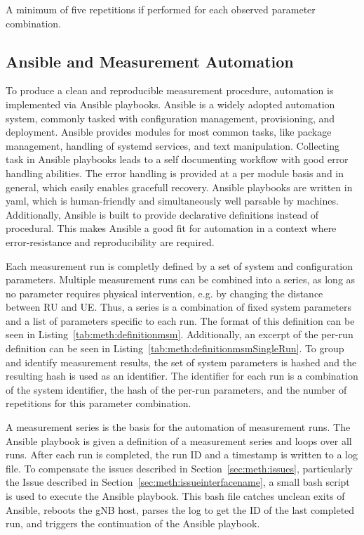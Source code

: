 A minimum of five repetitions if performed for each observed parameter combination.


\subsection{Ansible and Measurement Automation}\label{sec:meth:measureautomation}
To produce a clean and reproducible measurement procedure, automation is implemented via Ansible playbooks.\cite{ansible}
Ansible is a widely adopted automation system, commonly tasked with configuration management,
provisioning, and deployment.
Ansible provides modules for most common tasks, like package management, handling of systemd services, and text manipulation.
Collecting task in Ansible playbooks leads to a self documenting workflow with good error handling abilities.
The error handling is provided at a per module basis and in general, which easily enables gracefull recovery.
Ansible playbooks are written in yaml, which is human-friendly and simultaneously well parsable by machines.
Additionally, Ansible is built to provide declarative definitions instead of procedural.
This makes Ansible a good fit for automation in a context where error-resistance and reproducibility are required.

Each measurement run is completly defined by a set of system and configuration parameters.
Multiple measurement runs can be combined into a series, as long as no parameter requires physical intervention,
e.g. by changing the distance between \gls{RU} and \gls{UE}.
Thus, a series is a combination of fixed system parameters and a list of parameters specific to each run.
The format of this definition can be seen in Listing~\ref{tab:meth:definitionmsm}.
Additionally, an excerpt of the per-run definition can be seen in Listing~\ref{tab:meth:definitionmsmSingleRun}.
To group and identify measurement results, the set of system parameters is hashed and the resulting hash
is used as an identifier.
The identifier for each run is a combination of the system identifier, the hash of the per-run parameters,
and the number of repetitions for this parameter combination.

A measurement series is the basis for the automation of measurement runs.
The Ansible playbook is given a definition of a measurement series and loops over all runs.
After each run is completed, the run ID and a timestamp is written to a log file.
To compensate the issues described in Section~\ref{sec:meth:issues}, particularly the Issue described
in Section~\ref{sec:meth:issueinterfacename}, a small bash script is used to execute the Ansible playbook.
This bash file catches unclean exits of Ansible, reboots the \gls{gNB} host, parses the log to get
the ID of the last completed run, and triggers the continuation of the Ansible playbook.



